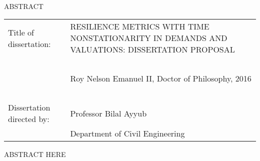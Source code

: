 
\hbox{\ }

\renewcommand{\baselinestretch}{1}
\small \normalsize

\begin{center}
\large{{ABSTRACT}} 

\vspace{3em} 

\end{center}
\hspace{-.15in}
\begin{tabular}{ll}
Title of dissertation:    & {\large  RESILIENCE METRICS WITH TIME
  NONSTATIONARITY IN DEMANDS AND VALUATIONS: DISSERTATION PROPOSAL }\\
\ \\
&                          {\large  Roy Nelson Emanuel II, Doctor of Philosophy, 2016} \\
\ \\
Dissertation directed by: & {\large  Professor Bilal Ayyub} \\
&  				{\large	 Department of Civil Engineering } \\
\end{tabular}

\vspace{3em}

\renewcommand{\baselinestretch}{2}
\large \normalsize

ABSTRACT HERE


